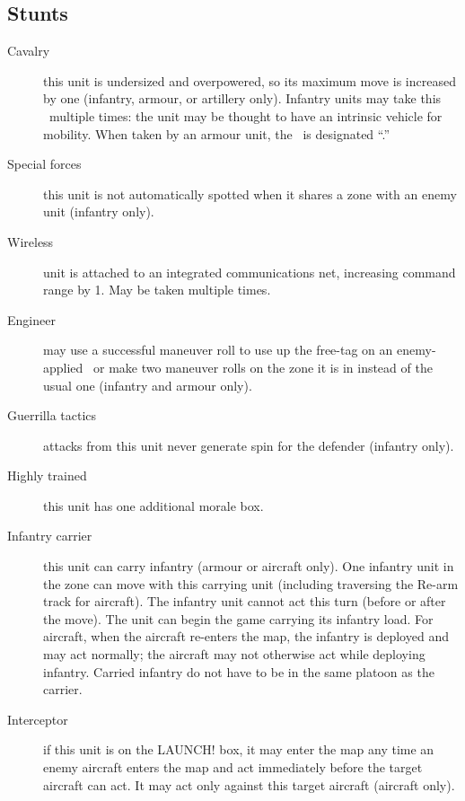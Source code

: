 \subsection{Stunts}\label{sec:unit-stunts}
\begin{description}
\item[Cavalry]
this unit is undersized and overpowered, so its maximum move is increased by one (infantry, armour, or artillery only). Infantry units may take this \Stunt\ multiple times: the unit may be thought to have an intrinsic vehicle for mobility. When taken by an armour unit, the \Stunt\ is designated ``.''

\item[Special forces]
this unit is not automatically spotted when it shares a zone with an enemy unit (infantry only).

\item[Wireless]
unit is attached to an integrated communications net, increasing command range by 1. May be taken multiple times.

\item[Engineer]
may use a successful maneuver roll to use up the free-tag on an enemy-applied \Aspect\ or make two maneuver rolls on the zone it is in instead of the usual one (infantry and armour only).

\item[Guerrilla tactics]
attacks from this unit never generate spin for the defender (infantry only).

\item[Highly trained]
this unit has one additional morale box.

\item[Infantry carrier]
this unit can carry infantry (armour or aircraft only). One infantry unit in the zone can move with this carrying unit (including traversing the Re-arm track for aircraft). The infantry unit cannot act this turn (before or after the move). The unit can begin the game carrying its infantry load. For aircraft, when the aircraft re-enters the map, the infantry is deployed and may act normally; the aircraft may not otherwise act while deploying infantry. Carried infantry do not have to be in the same platoon as the carrier.

\item[Interceptor]
if this unit is on the LAUNCH! box, it may enter the map any time an enemy aircraft enters the map and act immediately before the target aircraft can act. It may act only against this target aircraft (aircraft only).


\end{description}
